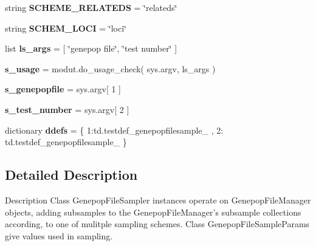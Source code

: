 \begin{DoxyCompactItemize}
\item 
string {\bfseries S\+C\+H\+E\+M\+E\+\_\+\+R\+E\+L\+A\+T\+E\+DS} = \char`\"{}relateds\char`\"{}\hypertarget{namespacenegui_1_1genepopfilesampler_acec997bb8951673a46f30157dd69973e}{}\label{namespacenegui_1_1genepopfilesampler_acec997bb8951673a46f30157dd69973e}

\item 
string {\bfseries S\+C\+H\+E\+M\+\_\+\+L\+O\+CI} = \char`\"{}loci\char`\"{}\hypertarget{namespacenegui_1_1genepopfilesampler_a389ea2c8351b6c9f6a405cb2c4a1fff4}{}\label{namespacenegui_1_1genepopfilesampler_a389ea2c8351b6c9f6a405cb2c4a1fff4}

\item 
list {\bfseries ls\+\_\+args} = \mbox{[} \char`\"{}genepop file\char`\"{}, \char`\"{}test number\char`\"{} \mbox{]}\hypertarget{namespacenegui_1_1genepopfilesampler_af0949cf58ac4626034b74cc9feaf35de}{}\label{namespacenegui_1_1genepopfilesampler_af0949cf58ac4626034b74cc9feaf35de}

\item 
{\bfseries s\+\_\+usage} = modut.\+do\+\_\+usage\+\_\+check( sys.\+argv, ls\+\_\+args )\hypertarget{namespacenegui_1_1genepopfilesampler_a50569ca2f7b58beeb1163ff3e3578bc6}{}\label{namespacenegui_1_1genepopfilesampler_a50569ca2f7b58beeb1163ff3e3578bc6}

\item 
{\bfseries s\+\_\+genepopfile} = sys.\+argv\mbox{[} 1 \mbox{]}\hypertarget{namespacenegui_1_1genepopfilesampler_a950ccfdc83d7493167c08843392ce46c}{}\label{namespacenegui_1_1genepopfilesampler_a950ccfdc83d7493167c08843392ce46c}

\item 
{\bfseries s\+\_\+test\+\_\+number} = sys.\+argv\mbox{[} 2 \mbox{]}\hypertarget{namespacenegui_1_1genepopfilesampler_adc2001c9e9a7d948254b3cdc332a6977}{}\label{namespacenegui_1_1genepopfilesampler_adc2001c9e9a7d948254b3cdc332a6977}

\item 
dictionary {\bfseries ddefs} = \{ 1\+:td.\+testdef\+\_\+genepopfilesample\+\_ , 2\+: td.\+testdef\+\_\+genepopfilesample\+\_ \}\hypertarget{namespacenegui_1_1genepopfilesampler_a05caff4e04dff14a4594c4696dbd2496}{}\label{namespacenegui_1_1genepopfilesampler_a05caff4e04dff14a4594c4696dbd2496}

\end{DoxyCompactItemize}


\subsection{Detailed Description}
\begin{DoxyVerb}Description
Class GenepopFileSampler instances operate on GenepopFileManager objects,
adding subsamples to the GenepopFileManager's subsample collections according,
to one of mulitple sampling schemes.  Class GenepopFileSampleParams give 
values used in sampling.
\end{DoxyVerb}
 